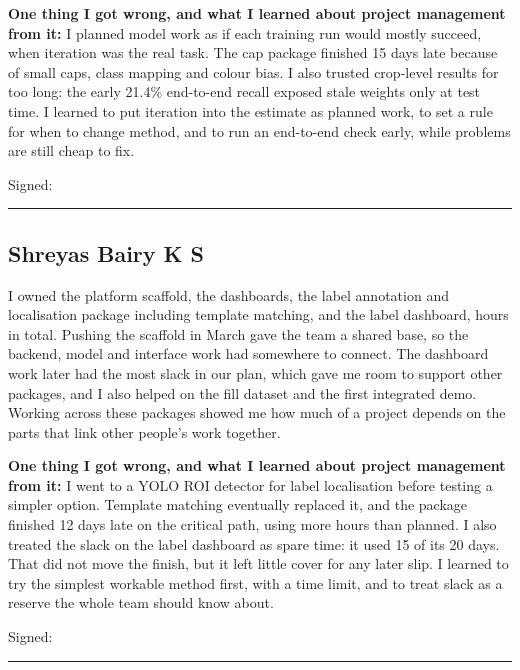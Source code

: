 \textbf{One thing I got wrong, and what I learned about project management from it:} I planned model work as if each training run would mostly succeed, when iteration was the real task. The cap package finished 15 days late because of small caps, class mapping and colour bias. I also trusted crop-level results for too long: the early 21.4\% end-to-end recall exposed stale weights only at test time. I learned to put iteration into the estimate as planned work, to set a rule for when to change method, and to run an end-to-end check early, while problems are still cheap to fix.

Signed: \rule{4cm}{0.4pt}

\subsection*{Shreyas Bairy K S}
I owned the platform scaffold, the dashboards, the label annotation and localisation package including template matching, and the label dashboard, \vHoursSh{} hours in total. Pushing the scaffold in March gave the team a shared base, so the backend, model and interface work had somewhere to connect. The dashboard work later had the most slack in our plan, which gave me room to support other packages, and I also helped on the fill dataset and the first integrated demo. Working across these packages showed me how much of a project depends on the parts that link other people's work together.

\textbf{One thing I got wrong, and what I learned about project management from it:} I went to a YOLO ROI detector for label localisation before testing a simpler option. Template matching eventually replaced it, and the package finished 12 days late on the critical path, using more hours than planned. I also treated the slack on the label dashboard as spare time: it used 15 of its 20 days. That did not move the finish, but it left little cover for any later slip. I learned to try the simplest workable method first, with a time limit, and to treat slack as a reserve the whole team should know about.

Signed: \rule{4cm}{0.4pt}
